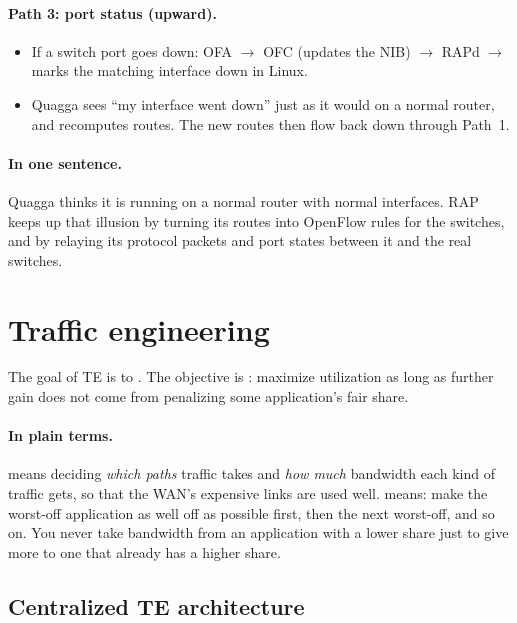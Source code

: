 \paragraph{Path 3: port status (upward).}
\begin{itemize}
\item If a switch port goes down: OFA $\to$ OFC (updates the NIB) $\to$ RAPd $\to$ marks the matching  interface down in Linux.
\item Quagga sees ``my interface went down'' just as it would on a normal router, and recomputes routes. The new routes then flow back down through Path~1.
\end{itemize}

\paragraph{In one sentence.} Quagga thinks it is running on a normal router with normal interfaces. RAP keeps up that illusion by turning its routes into OpenFlow rules for the switches, and by relaying its protocol packets and port states between it and the real switches.
\section{Traffic engineering}
The goal of TE is to . The objective is : maximize utilization as long as further gain does not come from penalizing some application's fair share.

\paragraph{In plain terms.}  means deciding \emph{which paths} traffic takes and \emph{how much} bandwidth each kind of traffic gets, so that the WAN's expensive links are used well.  means: make the worst-off application as well off as possible first, then the next worst-off, and so on. You never take bandwidth from an application with a lower share just to give more to one that already has a higher share.

\subsection{Centralized TE architecture}

